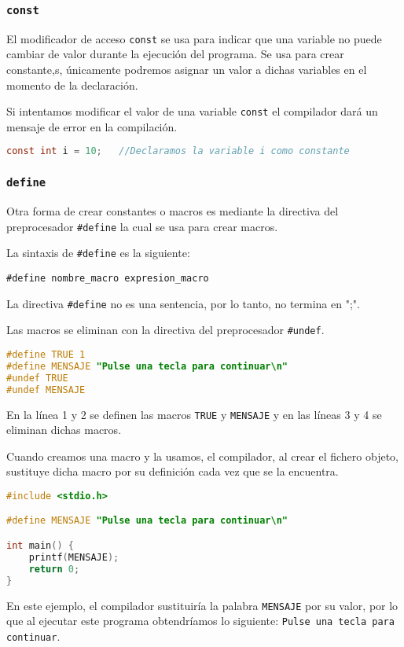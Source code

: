 \subsubsection{\texttt{const}}{
El modificador de acceso \texttt{const} se usa para indicar que una variable no puede cambiar de valor durante la ejecución del programa. Se usa para crear constante,s, únicamente podremos asignar un valor a dichas variables en el momento de la declaración.

Si intentamos modificar el valor de una variable \texttt{const} el compilador dará un mensaje de error en la compilación.
\begin{Ejemplo}
\begin{lstlisting}[language=C]
const int i = 10;	//Declaramos la variable i como constante
\end{lstlisting}
\end{Ejemplo}
}
\subsubsection{\texttt{define}}{
Otra forma de crear constantes o macros es mediante la directiva del preprocesador \texttt{\#define} la cual se usa para crear macros.

La sintaxis de \texttt{\#define} es la siguiente:

\texttt{\#define nombre\_macro expresion\_macro}

La directiva \texttt{\#define} no es una sentencia, por lo tanto, no termina en ";".

Las macros se eliminan con la directiva del preprocesador \texttt{\#undef}.
\begin{Ejemplo}
\begin{lstlisting}[language=C]
#define TRUE 1
#define MENSAJE "Pulse una tecla para continuar\n"
#undef TRUE
#undef MENSAJE
\end{lstlisting}
\Explicacion
En la línea 1 y 2 se definen las macros \texttt{TRUE} y \texttt{MENSAJE} y en las líneas 3 y 4 se eliminan dichas macros.\\
\end{Ejemplo}
Cuando creamos una macro y la usamos, el compilador, al crear el fichero objeto, sustituye dicha macro por su definición cada vez que se la encuentra.
\newpage
\begin{Ejemplo}
\begin{lstlisting}[language=C]
#include <stdio.h>

#define MENSAJE "Pulse una tecla para continuar\n"

int main() {
    printf(MENSAJE);
    return 0;
}
\end{lstlisting}
\Explicacion
En este ejemplo, el compilador sustituiría la palabra \texttt{MENSAJE} por su valor, por lo que al ejecutar este programa obtendríamos lo siguiente: \texttt{Pulse una tecla para continuar}.
\end{Ejemplo}
}
